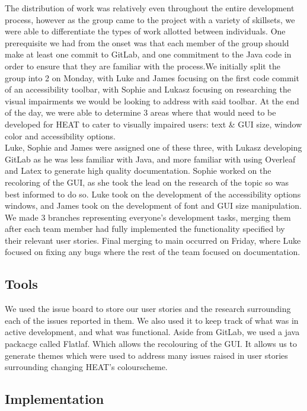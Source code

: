 The distribution of work was relatively even throughout the entire development process, however as the group came to the project with a variety of skillsets, we were able to differentiate the types of work allotted between individuals. One prerequisite we had from the onset was that each member of the group should make at least one commit to GitLab, and one commitment to the Java code in order to ensure that they are familiar with the process.We initially split the group into 2 on Monday, with Luke and James focusing on the first code commit of an accessibility toolbar, with Sophie and Lukasz focusing on researching the visual impairments we would be looking to address with said toolbar. At the end of the day, we were able to determine 3 areas where that would need to be developed for HEAT to cater to visually impaired users: text \& GUI size, window color and accessibility options. \\

Luke, Sophie and James were assigned one of these three, with Lukasz developing GitLab as he was less familiar with Java, and more familiar with using Overleaf and Latex to generate high quality documentation. Sophie worked on the recoloring of the GUI, as she took the lead on the research of the topic so was best informed to do so. Luke took on the development of the accessibility options windows, and James took on the development of font and GUI size manipulation. We made 3 branches representing everyone's development tasks, merging them after each team member had fully implemented the functionality specified by their relevant user stories. Final merging to main occurred on Friday, where Luke focused on fixing any bugs where the rest of the team focused on documentation.


\subsection{\textbf{Tools}}

We used the issue board to store our user stories and the research surrounding each of the issues reported in them. We also used it to keep track of what was in active development, and what was functional. Aside from GitLab, we used a java packacge called Flatlaf. Which allows the recolouring of the GUI. It allows us to generate themes which were used to address many issues raised in user stories surrounding changing HEAT’s colourscheme.   


\subsection{\textbf{Implementation}}

